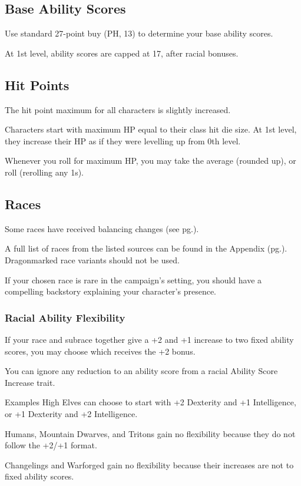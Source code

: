 \documentclass[letterpaper,twocolumn,openany,nodeprecatedcode]{dndbook}
\newcommand{\pg}[1]{pg.\pageref{#1}}
\begin{document}
\subsection{Base Ability Scores}
Use standard 27-point buy (PH, 13) to determine your base ability scores. 

At 1st level, ability scores are capped at 17, after racial bonuses.

\subsection{Hit Points}
The hit point maximum for all characters is slightly increased. 

Characters start with maximum HP equal to their class hit die size. At 1st level, they increase their HP as if they were levelling up from 0th level.

Whenever you roll for maximum HP, you may take the average (rounded up), or roll (rerolling any 1s).

\subsection{Races}
Some races have received balancing changes (see \pg{balance-races}).

A full list of races from the listed sources can be found in the Appendix (\pg{appendix-races}). Dragonmarked race variants should not be used.

If your chosen race is rare in the campaign's setting, you should have a compelling backstory explaining your character's presence.

\subsubsection{Racial Ability Flexibility}
If your race and subrace together give a +2 and +1 increase to two fixed ability scores, you may choose which receives the +2 bonus.

You can ignore any reduction to an ability score from a racial Ability Score Increase trait.

\begin{DndComment}{Examples}
High Elves can choose to start with +2 Dexterity and +1 Intelligence, or +1 Dexterity and +2 Intelligence. 

Humans, Mountain Dwarves, and Tritons gain no flexibility because they do not follow the +2/+1 format.

Changelings and Warforged gain no flexibility because their increases are not to fixed ability scores.
\end{DndComment}
\end{document}
